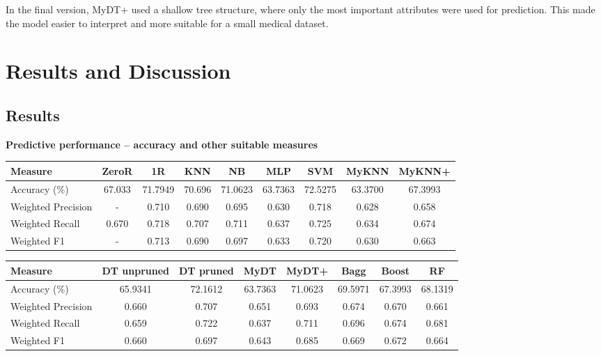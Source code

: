\documentclass[12pt,a4paper]{article}
\begin{document}
In the final version, MyDT+ used a shallow tree structure, where only the most important attributes were used for prediction. This made the model easier to interpret and more suitable for a small medical dataset.

\section{Results and Discussion}
\subsection{Results}

\textbf{Predictive performance -- accuracy and other suitable measures}

{\scriptsize
\begin{center}
\begin{tabular}{|l|c|c|c|c|c|c|c|c|}
\hline
Measure & ZeroR & 1R & KNN & NB & MLP & SVM & MyKNN & MyKNN+ \\
\hline
Accuracy (\%) & 67.033 & 71.7949 & 70.696 & 71.0623 & 63.7363 & 72.5275 & 63.3700 & 67.3993 \\
\hline
Weighted Precision & - & 0.710 & 0.690 & 0.695 & 0.630 & 0.718 & 0.628 & 0.658 \\
\hline
Weighted Recall & 0.670 & 0.718 & 0.707 & 0.711 & 0.637 & 0.725 & 0.634 & 0.674 \\
\hline
Weighted F1 & - & 0.713 & 0.690 & 0.697 & 0.633 & 0.720 & 0.630 & 0.663 \\
\hline
\end{tabular}
\end{center}
}

{\scriptsize
\begin{center}
\begin{tabular}{|l|c|c|c|c|c|c|c|}
\hline
Measure & DT unpruned & DT pruned & MyDT & MyDT+ & Bagg & Boost & RF \\
\hline
Accuracy (\%) & 65.9341 & 72.1612 & 63.7363 & 71.0623 & 69.5971 & 67.3993 & 68.1319 \\
\hline
Weighted Precision & 0.660 & 0.707 & 0.651 & 0.693 & 0.674 & 0.670 & 0.661 \\
\hline
Weighted Recall & 0.659 & 0.722 & 0.637 & 0.711 & 0.696 & 0.674 & 0.681 \\
\hline
Weighted F1 & 0.660 & 0.697 & 0.643 & 0.685 & 0.669 & 0.672 & 0.664 \\
\hline
\end{tabular}
\end{center}
}
\end{document}
